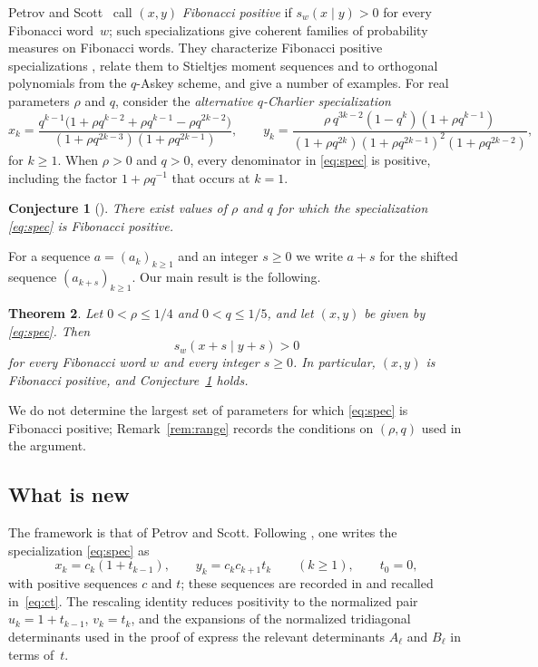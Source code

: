 \documentclass[11pt]{amsart}
\newtheorem{theorem}{Theorem}[section]
\newtheorem{conjecture}[theorem]{Conjecture}
\theoremstyle{definition}
\theoremstyle{remark}
\numberwithin{equation}{section}
\begin{document}
Petrov and Scott~\cite{PS26} call $(x,y)$ \emph{Fibonacci positive} if $s_w(x\mid y)>0$ for every Fibonacci word~$w$; such specializations give coherent families of probability measures on Fibonacci words. They characterize Fibonacci positive specializations \cite[Theorem~4.12]{PS26}, relate them to Stieltjes moment sequences and to orthogonal polynomials from the $q$-Askey scheme, and give a number of examples. For real parameters $\rho$ and $q$, consider the \emph{alternative $q$-Charlier specialization}
\begin{equation}\label{eq:spec}
x_k=\frac{q^{k-1}\bigl(1+\rho q^{k-2}+\rho q^{k-1}-\rho q^{2k-2}\bigr)}{(1+\rho q^{2k-3})(1+\rho q^{2k-1})},
\qquad
y_k=\frac{\rho\, q^{3k-2}(1-q^k)(1+\rho q^{k-1})}{(1+\rho q^{2k})(1+\rho q^{2k-1})^2(1+\rho q^{2k-2})},
\end{equation}
for $k\ge1$. When $\rho>0$ and $q>0$, every denominator in \eqref{eq:spec} is positive, including the factor $1+\rho q^{-1}$ that occurs at $k=1$.

\begin{conjecture}[{\cite[Conjecture~6.3]{PS26}}]\label{conj:PS}
There exist values of $\rho$ and $q$ for which the specialization \eqref{eq:spec} is Fibonacci positive.
\end{conjecture}

For a sequence $a=(a_k)_{k\ge1}$ and an integer $s\ge0$ we write $a+s$ for the shifted sequence $(a_{k+s})_{k\ge1}$. Our main result is the following.

\begin{theorem}\label{thm:main}
Let $0<\rho\le 1/4$ and $0<q\le 1/5$, and let $(x,y)$ be given by \eqref{eq:spec}. Then
\[
s_w(x+s\mid y+s)>0
\]
for every Fibonacci word $w$ and every integer $s\ge0$. In particular, $(x,y)$ is Fibonacci positive, and Conjecture~\ref{conj:PS} holds.
\end{theorem}

We do not determine the largest set of parameters for which \eqref{eq:spec} is Fibonacci positive; Remark~\ref{rem:range} records the conditions on $(\rho,q)$ used in the argument.

\subsection*{What is new}
The framework is that of Petrov and Scott. Following \cite[Section~4.1]{PS26}, one writes the specialization \eqref{eq:spec} as
\[
x_k=c_k(1+t_{k-1}),\qquad y_k=c_kc_{k+1}t_k\qquad(k\ge1),\qquad t_0=0,
\]
with positive sequences $c$ and $t$; these sequences are recorded in \cite[Conjecture~6.3]{PS26} and recalled in~\eqref{eq:ct}. The rescaling identity \cite[(2.13)]{PS26} reduces positivity to the normalized pair $u_k=1+t_{k-1}$, $v_k=t_k$, and the expansions of the normalized tridiagonal determinants used in the proof of \cite[Proposition~4.7]{PS26} express the relevant determinants $A_\ell$ and $B_\ell$ in terms of~$t$.
\end{document}
